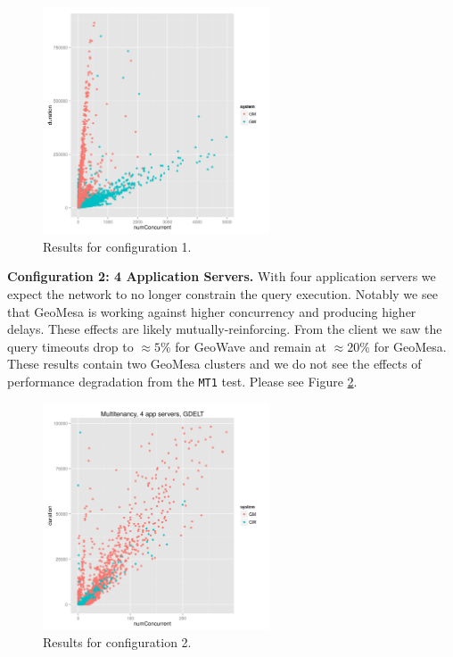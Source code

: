 \begin{figure}[h!tb]
  \centering
  \includegraphics[width=0.60\textwidth]{../docs/img/multitenancy/graph_uncut_mt1.png}
  \caption{Results for configuration 1.}
  \label{config1}
\end{figure}

{\bf Configuration 2: 4 Application Servers.}
With four application servers we expect the network to no longer constrain the query execution.
Notably we see that GeoMesa is working against higher concurrency and producing higher delays.
These effects are likely mutually-reinforcing.
From the client we saw the query timeouts drop to $ \approx 5$\% for GeoWave and remain at $\approx 20$\% for GeoMesa.
These results contain two GeoMesa clusters and we do not see the effects of performance degradation from the \texttt{MT1} test.
Please see Figure \ref{config2}.

\begin{figure}[h!tb]
  \centering
  \includegraphics[width=0.60\textwidth]{../docs/img/multitenancy/graph_100k_mt2.png}
  \caption{Results for configuration 2.}
  \label{config2}
\end{figure}

